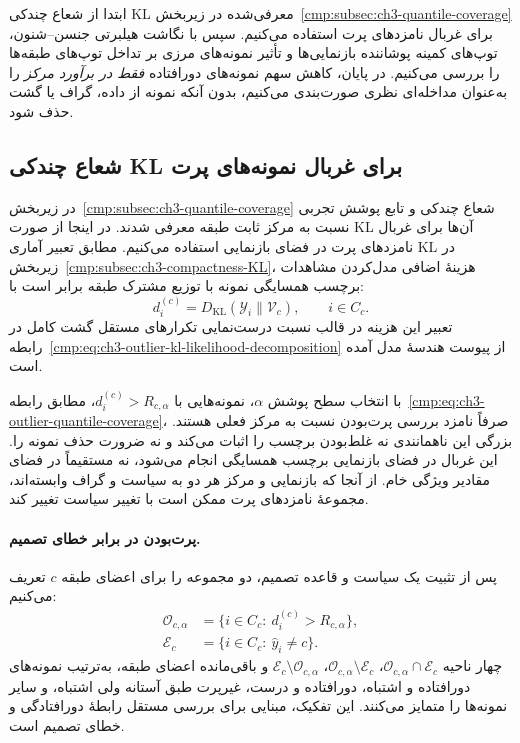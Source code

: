 ابتدا از شعاع چندکی KL معرفی‌شده در
زیربخش~\ref{cmp:subsec:ch3-quantile-coverage}
برای غربال نامزدهای پرت استفاده می‌کنیم.
سپس با نگاشت هیلبرتی جنسن--شنون،
توپ‌های کمینه پوشاننده بازنمایی‌ها
و تأثیر نمونه‌های مرزی بر تداخل
توپ‌های طبقه‌ها را بررسی می‌کنیم.
در پایان، کاهش سهم نمونه‌های
دورافتاده \emph{فقط در برآورد مرکز}
را به‌عنوان مداخله‌ای نظری
صورت‌بندی می‌کنیم، بدون آنکه
نمونه از داده، گراف یا گشت
حذف شود.


\subsection{شعاع چندکی KL برای غربال نمونه‌های پرت}
\label{cmp:subsec:ch3-outlier-quantile-radius}

در زیربخش~\ref{cmp:subsec:ch3-quantile-coverage}
شعاع چندکی و تابع پوشش تجربی نسبت به مرکز ثابت
طبقه معرفی شدند. در اینجا از صورت KL آن‌ها برای
غربال نامزدهای پرت در فضای بازنمایی استفاده
می‌کنیم. مطابق تعبیر آماری KL در
زیربخش~\ref{cmp:subsec:ch3-compactness-KL}،
هزینهٔ اضافی مدل‌کردن مشاهدات برچسب همسایگی
نمونه با توزیع مشترک طبقه برابر است با:
\begin{equation}\label{cmp:eq:ch3-outlier-forward-kl}
d_i^{(c)}=D_{\mathrm{KL}}(\mathscr Y_i\|\mathcal V_c),
\qquad i\in C_c.
\end{equation}
تعبیر این هزینه در قالب نسبت درست‌نمایی تکرارهای
مستقل گشت کامل در
رابطه~\eqref{cmp:eq:ch3-outlier-kl-likelihood-decomposition}
از پیوست هندسهٔ مدل آمده است.

با انتخاب سطح پوشش $\alpha$، نمونه‌هایی با
$d_i^{(c)}>R_{c,\alpha}$، مطابق
رابطه~\eqref{cmp:eq:ch3-outlier-quantile-coverage}،
صرفاً نامزد بررسی پرت‌بودن نسبت به مرکز فعلی هستند.
بزرگی این ناهمانندی نه غلط‌بودن برچسب را اثبات
می‌کند و نه ضرورت حذف نمونه را. این غربال در
فضای بازنمایی برچسب همسایگی انجام می‌شود، نه
مستقیماً در فضای مقادیر ویژگی خام. از آنجا که
بازنمایی و مرکز هر دو به سیاست و گراف وابسته‌اند،
مجموعهٔ نامزدهای پرت ممکن است با تغییر سیاست تغییر کند.

\paragraph{پرت‌بودن در برابر خطای تصمیم.}
پس از تثبیت یک سیاست و قاعده تصمیم، دو مجموعه
را برای اعضای طبقه $c$ تعریف می‌کنیم:
\begin{equation}\label{cmp:eq:ch3-outlier-error-sets}
\boxed{
\begin{aligned}
\mathcal O_{c,\alpha}
&=\{i\in C_c:\ d_i^{(c)}>R_{c,\alpha}\},\\
\mathcal E_c
&=\{i\in C_c:\ \widehat y_i\ne c\}.
\end{aligned}}
\end{equation}
چهار ناحیه
$\mathcal O_{c,\alpha}\cap\mathcal E_c$،
$\mathcal O_{c,\alpha}\setminus\mathcal E_c$،
$\mathcal E_c\setminus\mathcal O_{c,\alpha}$
و باقی‌مانده اعضای طبقه، به‌ترتیب
نمونه‌های دورافتاده و اشتباه، دورافتاده و درست،
غیرپرت طبق آستانه ولی اشتباه، و سایر نمونه‌ها
را متمایز می‌کنند. این تفکیک، مبنایی برای
بررسی مستقل رابطهٔ دورافتادگی و خطای تصمیم است.

